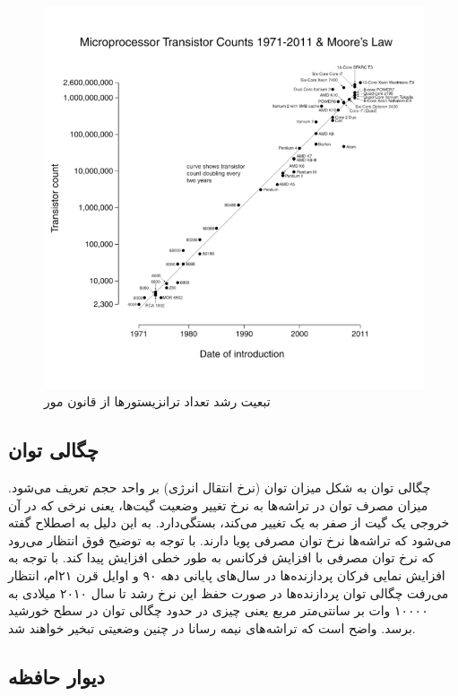 \documentclass{thesis}
\begin{document}
\begin{figure}[h]
\centering
\includegraphics[width=\textwidth]{./pics/5}
\caption{تبعیت رشد تعداد ترانزیستور‌ها از قانون مور}
\label{moorelaw}
\end{figure}

\subsection{
چگالی توان
}

چگالی توان
 به شکل میزان توان (نرخ انتقال انرژی) بر واحد حجم تعریف می‌شود. میزان
مصرف توان در تراشه‌ها به نرخ تغییر وضعیت گیت‌ها، یعنی نرخی که در آن 
خروجی یک گیت از صفر به یک تغییر می‌کند، بستگی‌دارد.
به
این
دلیل
به
اصطلاح گفته می‌شود که تراشه‌ها نرخ توان مصرفی پویا دارند.
با توجه به توضیح فوق انتظار می‌رود که نرخ توان مصرفی با افزایش فرکانس به طور
خطی افزایش پیدا کند. با توجه به افزایش نمایی فرکان پردازنده‌ها در سال‌های
پایانی دهه ۹۰ و اوایل قرن ۲۱ام، انتظار می‌رفت چگالی توان پردازنده‌ها در صورت
حفظ این نرخ رشد تا سال ۲۰۱۰ میلادی به ۱۰۰۰۰
وات بر سانتی‌متر مربع یعنی چیزی در حدود چگالی توان در سطح خورشید برسد. واضح است
که تراشه‌های نیمه رسانا در چنین وضعیتی تبخیر خواهند شد.

\subsection{
دیوار حافظه
}
\end{document}
